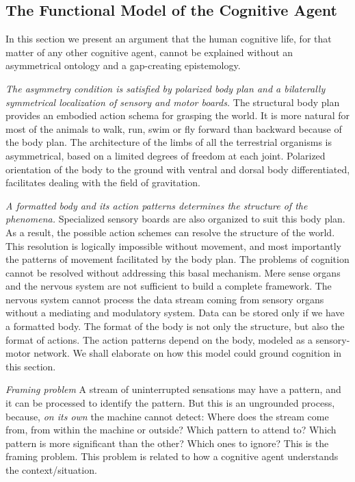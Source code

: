\subsection{The Functional Model of the Cognitive Agent}


In this section we present an argument that the human cognitive life, for that matter of any other cognitive agent, cannot be explained without an asymmetrical ontology and a gap-creating epistemology.  

\emph{The asymmetry condition is satisfied by polarized body plan and a bilaterally symmetrical localization of sensory and motor boards.}  
The structural body plan provides an embodied action schema for grasping the world. It is more natural for most of the animals to walk, run, swim or fly forward than backward because of the body plan. The architecture of the limbs of all the terrestrial organisms is asymmetrical, based on a limited degrees of freedom at each joint. Polarized orientation of the body to the ground with ventral and dorsal body differentiated, facilitates dealing with the field of gravitation. 

\emph{A formatted body and its action patterns determines the structure of the phenomena.} Specialized sensory boards are also organized to suit this body plan. As a result, the possible action schemes can resolve the structure of the world. This resolution is logically impossible without movement, and most importantly the patterns of movement facilitated by the body plan. The problems of cognition cannot be resolved without addressing this basal mechanism. Mere sense organs and the nervous system are not sufficient to build a complete framework. The nervous system cannot process the data stream coming from sensory organs without a mediating and modulatory system. Data can be stored only if we have a formatted body. The format of the body is not only the structure, but also the format of actions. The action patterns depend on the body, modeled as a sensory-motor network.  We shall elaborate on how this model could ground cognition in this section.

\emph{Framing problem} A stream of uninterrupted sensations may have a pattern, and it can be processed to identify the pattern. But this is an ungrounded process, because, \textit{on its own} the machine cannot detect: Where does the stream come from, from within the machine or outside? Which pattern to attend to? Which pattern is more significant than the other? Which ones to ignore? This is the framing problem. This problem is related to how a cognitive agent understands the context/situation. 

